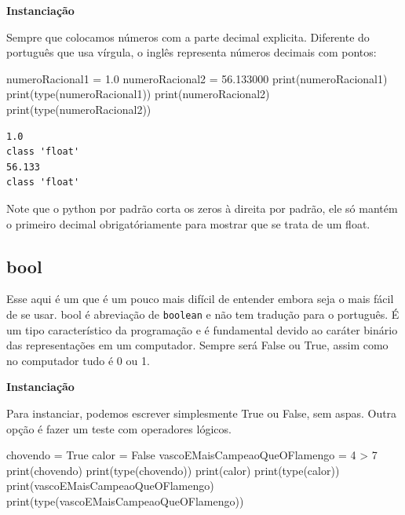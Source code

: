 \documentclass[
  letterpaper,
  DIV=11,
  numbers=noendperiod]{scrreprt}
\newenvironment{Shaded}{\begin{snugshade}}{\end{snugshade}}
\newcommand{\BuiltInTok}[1]{\textcolor[rgb]{0.00,0.23,0.31}{#1}}
\newcommand{\DecValTok}[1]{\textcolor[rgb]{0.68,0.00,0.00}{#1}}
\newcommand{\FloatTok}[1]{\textcolor[rgb]{0.68,0.00,0.00}{#1}}
\newcommand{\NormalTok}[1]{\textcolor[rgb]{0.00,0.23,0.31}{#1}}
\newcommand{\OperatorTok}[1]{\textcolor[rgb]{0.37,0.37,0.37}{#1}}
\newcommand{\VariableTok}[1]{\textcolor[rgb]{0.07,0.07,0.07}{#1}}
\begin{document}
\textbf{Instanciação}

Sempre que colocamos números com a parte decimal explicita. Diferente do
português que usa vírgula, o inglês representa números decimais com
pontos:

\begin{Shaded}
\begin{Highlighting}[]
\NormalTok{numeroRacional1 }\OperatorTok{=} \FloatTok{1.0}
\NormalTok{numeroRacional2 }\OperatorTok{=} \FloatTok{56.133000}
\BuiltInTok{print}\NormalTok{(numeroRacional1)}
\BuiltInTok{print}\NormalTok{(}\BuiltInTok{type}\NormalTok{(numeroRacional1))}
\BuiltInTok{print}\NormalTok{(numeroRacional2)}
\BuiltInTok{print}\NormalTok{(}\BuiltInTok{type}\NormalTok{(numeroRacional2))}
\end{Highlighting}
\end{Shaded}

\begin{tcolorbox}[enhanced jigsaw, breakable, leftrule=.75mm, left=2mm, opacityback=0, bottomrule=.15mm, toprule=.15mm, rightrule=.15mm, arc=.35mm, colback=white]

\begin{verbatim}
1.0
class 'float'
56.133
class 'float'
\end{verbatim}

\end{tcolorbox}

Note que o python por padrão corta os zeros à direita por padrão, ele só
mantém o primeiro decimal obrigatóriamente para mostrar que se trata de
um float.

\hypertarget{bool}{%
\subsection{bool}\label{bool}}

Esse aqui é um que é um pouco mais difícil de entender embora seja o
mais fácil de se usar. bool é abreviação de \texttt{boolean} e não tem
tradução para o português. É um tipo característico da programação e é
fundamental devido ao caráter binário das representações em um
computador. Sempre será False ou True, assim como no computador tudo é 0
ou 1.

\textbf{Instanciação}

Para instanciar, podemos escrever simplesmente True ou False, sem aspas.
Outra opção é fazer um teste com operadores lógicos.

\begin{Shaded}
\begin{Highlighting}[]
\NormalTok{chovendo }\OperatorTok{=} \VariableTok{True}
\NormalTok{calor }\OperatorTok{=} \VariableTok{False}
\NormalTok{vascoEMaisCampeaoQueOFlamengo }\OperatorTok{=} \DecValTok{4} \OperatorTok{\textgreater{}} \DecValTok{7}
\BuiltInTok{print}\NormalTok{(chovendo)}
\BuiltInTok{print}\NormalTok{(}\BuiltInTok{type}\NormalTok{(chovendo))}
\BuiltInTok{print}\NormalTok{(calor)}
\BuiltInTok{print}\NormalTok{(}\BuiltInTok{type}\NormalTok{(calor))}
\BuiltInTok{print}\NormalTok{(vascoEMaisCampeaoQueOFlamengo)}
\BuiltInTok{print}\NormalTok{(}\BuiltInTok{type}\NormalTok{(vascoEMaisCampeaoQueOFlamengo))}
\end{Highlighting}
\end{Shaded}
\end{document}
